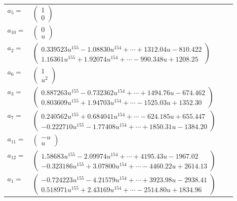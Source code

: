 \documentclass[1p]{elsarticle_modified}
\theoremstyle{definition}
\begin{document}
\begin{tabular}{m{7pt} m{180pt} m{7pt} m{180pt} }
\flushright $a_{5}=$&$\begin{pmatrix}1\\0\end{pmatrix}$ \\
\flushright $a_{10}=$&$\begin{pmatrix}0\\u\end{pmatrix}$ \\
\flushright $a_{2}=$&$\begin{pmatrix}0.339523 u^{155}-1.08830 u^{154}+\cdots+1312.04 u-810.422\\1.16361 u^{155}+1.92074 u^{154}+\cdots-990.348 u+1208.25\end{pmatrix}$ \\
\flushright $a_{6}=$&$\begin{pmatrix}1\\u^2\end{pmatrix}$ \\
\flushright $a_{3}=$&$\begin{pmatrix}0.887263 u^{155}-0.732362 u^{154}+\cdots+1494.76 u-674.462\\0.803609 u^{155}+1.94703 u^{154}+\cdots-1525.03 u+1352.30\end{pmatrix}$ \\
\flushright $a_{7}=$&$\begin{pmatrix}0.240562 u^{155}+0.684041 u^{154}+\cdots-624.185 u+655.447\\-0.222710 u^{155}-1.77408 u^{154}+\cdots+1850.31 u-1384.20\end{pmatrix}$ \\
\flushright $a_{11}=$&$\begin{pmatrix}- u\\u\end{pmatrix}$ \\
\flushright $a_{12}=$&$\begin{pmatrix}1.58683 u^{155}-2.09974 u^{154}+\cdots+4195.43 u-1967.02\\-0.323186 u^{155}+3.07800 u^{154}+\cdots-4460.22 u+2614.13\end{pmatrix}$ \\
\flushright $a_{1}=$&$\begin{pmatrix}-0.724223 u^{155}-4.21579 u^{154}+\cdots+3923.98 u-2938.41\\0.518971 u^{155}+2.43169 u^{154}+\cdots-2514.80 u+1834.96\end{pmatrix}$ \\

\end{tabular}
\end{document}
